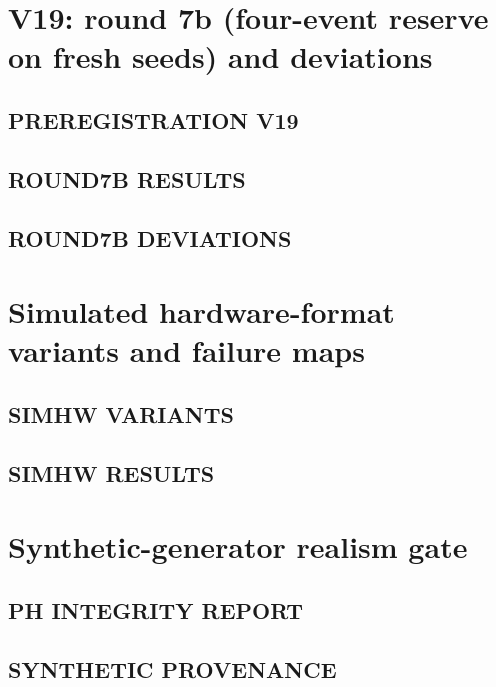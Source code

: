 \documentclass[10pt,a4paper]{article}
\begin{document}
\section{V19: round 7b (four-event reserve on fresh seeds) and deviations}

\subsection{PREREGISTRATION V19}


\subsection{ROUND7B RESULTS}


\subsection{ROUND7B DEVIATIONS}


\section{Simulated hardware-format variants and failure maps}

\subsection{SIMHW VARIANTS}


\subsection{SIMHW RESULTS}


\section{Synthetic-generator realism gate}

\subsection{PH INTEGRITY REPORT}


\subsection{SYNTHETIC PROVENANCE}

\end{document}

